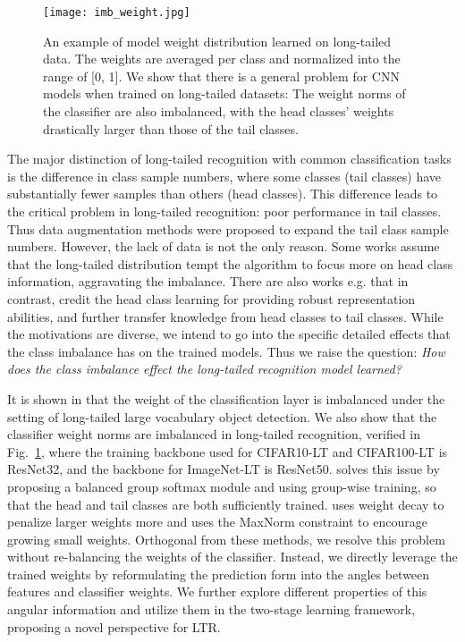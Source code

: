 \documentclass[10pt,twocolumn,letterpaper]{article}
\begin{document}
\begin{figure}[t]
  \centering
\texttt{[image: imb\_weight.jpg]}\vspace{-5pt}
   \caption{An example of model weight distribution learned on long-tailed data. The weights are averaged per class and normalized into the range of [0, 1]. We show that there is a general problem for CNN models when trained on long-tailed datasets: The weight norms of the classifier are also imbalanced, with the head classes' weights drastically larger than those of the tail classes.}
   \label{fig:weight_imb}
\end{figure}

The major distinction of long-tailed recognition with common classification tasks is the difference in class sample numbers, where some classes (tail classes) have substantially fewer samples than others (head classes). This difference leads to the critical problem in long-tailed recognition: poor performance in tail classes. Thus data augmentation methods \cite{metasaug,mixup} were proposed to expand the tail class sample numbers. However, the lack of data is not the only reason. Some works \cite{LTRweightbalancing} assume that the long-tailed distribution tempt the algorithm to focus more on head class information, aggravating the imbalance. There are also works e.g. \cite{trans_learning} that in contrast, credit the head class learning for providing robust representation abilities, and further transfer knowledge from head classes to tail classes. While the motivations are diverse, we intend to go into the specific detailed effects that the class imbalance has on the trained models. Thus we raise the question: \textit{How does the class imbalance effect the long-tailed recognition model learned?}


It is shown in \cite{bgs} that the weight of the classification layer is imbalanced under the setting of long-tailed large vocabulary object detection. We also show that the classifier weight norms are imbalanced in long-tailed recognition, verified in Fig.~\ref{fig:weight_imb}, where the training backbone used for CIFAR10-LT and CIFAR100-LT \cite{ldam} is ResNet32, and the backbone for ImageNet-LT is ResNet50. \cite{bgs} solves this issue by proposing a balanced group softmax module and using group-wise training, so that the head and tail classes are both sufficiently trained. \cite{LTRweightbalancing} uses weight decay to penalize larger weights more and uses the MaxNorm constraint \cite{maxnorm} to encourage growing small weights. Orthogonal from these methods, we resolve this problem without re-balancing the weights of the classifier. Instead, we directly leverage the trained weights by reformulating the prediction form into the angles between features and classifier weights. We further explore different properties of this angular information and utilize them in the two-stage learning framework, proposing a novel perspective for LTR.
\end{document}
